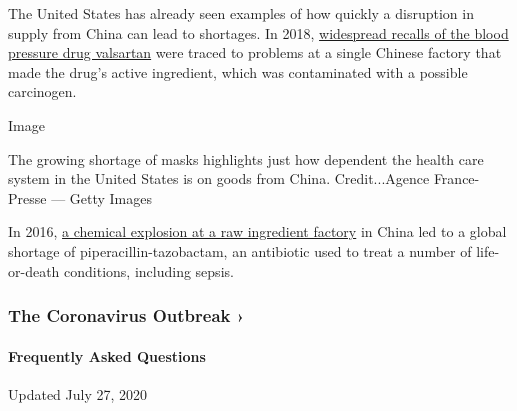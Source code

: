 The United States has already seen examples of how quickly a disruption
in supply from China can lead to shortages. In 2018,
\href{https://www.nytimes.com/2018/07/16/health/fda-blood-pressure-valsartan.html}{widespread
recalls of the blood pressure drug valsartan} were traced to problems at
a single Chinese factory that made the drug's active ingredient, which
was contaminated with a possible carcinogen.

Image

The growing shortage of masks highlights just how dependent the health
care system in the United States is on goods from China. Credit...Agence
France-Presse --- Getty Images

In 2016,
\href{https://www.theguardian.com/society/2017/jul/01/antibiotic-shortage-puts-patients-at-risk}{a
chemical explosion at a raw ingredient factory} in China led to a global
shortage of piperacillin-tazobactam, an antibiotic used to treat a
number of life-or-death conditions, including sepsis.

\href{https://www.nytimes.com/news-event/coronavirus?action=click\&pgtype=Article\&state=default\&region=MAIN_CONTENT_3\&context=storylines_faq}{}

\hypertarget{the-coronavirus-outbreak-}{%
\subsubsection{The Coronavirus Outbreak
›}\label{the-coronavirus-outbreak-}}

\hypertarget{frequently-asked-questions}{%
\paragraph{Frequently Asked
Questions}\label{frequently-asked-questions}}

Updated July 27, 2020

